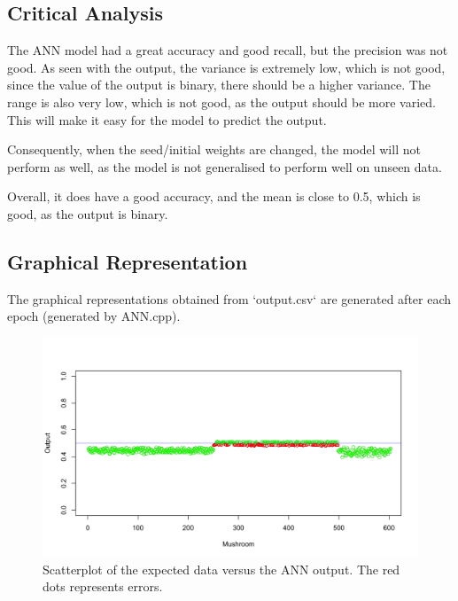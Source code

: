 \documentclass{article}
\begin{document}
\subsection{Critical Analysis}
The ANN model had a great accuracy and good recall, but the precision was not good. As seen with the output, the variance is extremely low, which is not good, since the value of the output is binary, there should be a higher variance. The range is also very low, which is not good, as the output should be more varied. This will make it easy for the model to predict the output. 

Consequently, when the seed/initial weights are changed, the model will not perform as well, as the model is not generalised to perform well on unseen data.

Overall, it does have a good accuracy, and the mean is close to 0.5, which is good, as the output is binary.

\subsection{Graphical Representation}
The graphical representations obtained from `output.csv` are generated after each epoch (generated by ANN.cpp).
    \begin{figure}[H]
        \includegraphics[width=\linewidth]{scatterplot.png}
        \caption{Scatterplot of the expected data versus the ANN output. The red dots represents errors.}
        \label{fig:ils}
    \end{figure}
\end{document}
